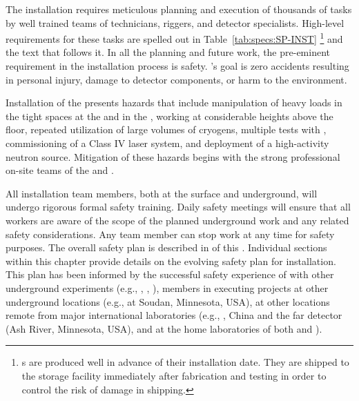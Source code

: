 The installation requires meticulous planning and execution of thousands of tasks by well trained teams of technicians, riggers, and detector specialists. 
High-level requirements for these tasks are spelled out in Table~\ref{tab:specs:SP-INST}
\footnote{s are produced well in advance of their installation date. They are shipped to the storage facility immediately after fabrication and testing in order to control the risk of damage in shipping.} 
and the text that follows it. 
In all the planning and future work, the pre-eminent requirement in the installation process is safety.
's goal is zero accidents resulting in personal injury, damage to detector components, or harm to the environment.


%


Installation of the  presents %
 hazards that include manipulation of heavy loads in the tight spaces at the  and in the ,  working at considerable heights above the floor, repeated utilization of large volumes of cryogens, multiple tests with , commissioning of a Class IV laser system, and deployment of a high-activity neutron source. Mitigation of these hazards begins with the strong professional on-site  teams of the  and .

All installation team members, both at the surface and underground, will undergo rigorous formal safety training. Daily safety meetings will ensure that all workers are aware of the scope of the planned underground work and any related safety considerations. Any team member can stop work at any time for safety purposes. The overall  safety plan is described in   
 \tcchesh{} %
 of this .  Individual sections within this chapter provide details on the evolving safety plan for installation. This plan has been informed by the successful safety experience of  with other underground experiments (e.g., , , ),  members in executing projects at other underground locations (e.g.,  at Soudan, Minnesota, USA), at other locations remote from major international laboratories (e.g., , China and the  far detector (Ash River, Minnesota, USA), and at the home laboratories of both  and ).

